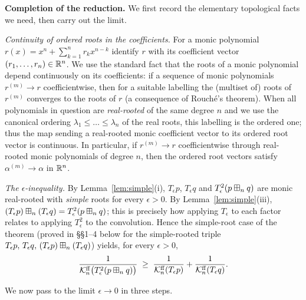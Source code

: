 \noindent\textbf{Completion of the reduction.}
We first record the elementary topological facts we need, then carry out the
limit.

\medskip
\noindent\textit{Continuity of ordered roots in the coefficients.}
For a monic polynomial $r(x)=x^n+\sum_{k=1}^n r_k x^{n-k}$ identify $r$ with its
coefficient vector $(r_1,\dots,r_n)\in\mathbb{R}^n$. We use the standard fact that
the roots of a monic polynomial depend continuously on its coefficients: if a
sequence of monic polynomials $r^{(m)}\to r$ coefficientwise, then for a suitable
labelling the (multiset of) roots of $r^{(m)}$ converges to the roots of $r$
\cite[Ch.~II, App.~A]{Whitney} (a consequence of Rouch\'e's theorem). When all
polynomials in question are \emph{real-rooted} of the same degree $n$ and we use
the canonical ordering $\lambda_1\le\dots\le\lambda_n$ of the real roots, this
labelling is the ordered one; thus the map sending a real-rooted monic
coefficient vector to its ordered root vector is continuous. In particular, if
$r^{(m)}\to r$ coefficientwise through real-rooted monic polynomials of degree
$n$, then the ordered root vectors satisfy $\alpha^{(m)}\to\alpha$ in $\mathbb{R}^n$.

\medskip
\noindent\textit{The $\epsilon$-inequality.}
By Lemma~\ref{lem:simple}(i), $T_\epsilon p$, $T_\epsilon q$ and
$T_\epsilon^2(p\boxplus_n q)$ are monic real-rooted with \emph{simple} roots for
every $\epsilon>0$. By Lemma~\ref{lem:simple}(iii),
$(T_\epsilon p)\boxplus_n(T_\epsilon q)=T_\epsilon^2(p\boxplus_n q)$; this is precisely
how applying $T_\epsilon$ to each factor relates to applying $T_\epsilon^2$ to the
convolution. Hence the simple-root case of the theorem (proved in §§1--4 below
for the simple-rooted triple $T_\epsilon p,\,T_\epsilon q,\,(T_\epsilon p)\boxplus_n(T_\epsilon q)$)
yields, for every $\epsilon>0$,
\begin{equation}\label{eq:eps-ineq}
\frac{1}{\mathcal{K}^{\mathrm{ff}}_n\bigl(T_\epsilon^2(p\boxplus_n q)\bigr)}\;\ge\;
\frac{1}{\mathcal{K}^{\mathrm{ff}}_n(T_\epsilon p)}+\frac{1}{\mathcal{K}^{\mathrm{ff}}_n(T_\epsilon q)}.
\end{equation}

We now pass to the limit $\epsilon\to 0$ in three steps.

